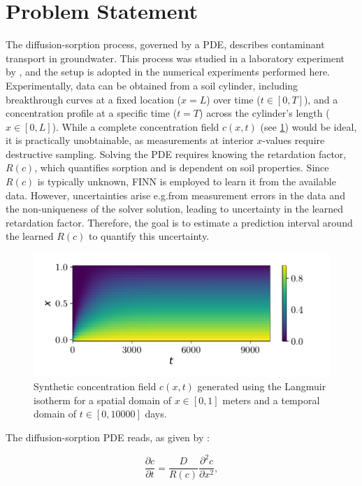 \section{Problem Statement}
The diffusion-sorption process, governed by a PDE, describes contaminant transport in groundwater. This process was studied in a laboratory experiment by \textcite{nowak2016entropy}, and the setup is adopted in the numerical experiments performed here. Experimentally, data can be obtained from a soil cylinder, including breakthrough curves at a fixed location ($x=L$) over time ($t \in [0, T]$), and a concentration profile at a specific time ($t=T$) across the cylinder's length ($x \in [0,L]$). While a complete concentration field $c(x,t)$ (see \cref{fig:c_diss_field_full}) would be ideal, it is practically unobtainable, as measurements at interior $x$-values require destructive sampling. Solving the PDE requires knowing the retardation factor, $R(c)$, which quantifies sorption and is dependent on soil properties. Since $R(c)$ is typically unknown, FINN is employed to learn it from the available data. However, uncertainties arise e.g.\@ from measurement errors in the data and the non-uniqueness of the solver solution, leading to uncertainty in the learned retardation factor. Therefore, the goal is to estimate a prediction interval around the learned $R(c)$ to quantify this uncertainty.

\begin{figure}[h]
    \centering
    \includegraphics{figs/c_diss_field_full.pdf}
    \caption{Synthetic concentration field $c(x,t)$ generated using the Langmuir isotherm for a spatial domain of $x \in [0, 1]$ meters and a temporal domain of $t \in [0, 10000]$ days.}
    \label{fig:c_diss_field_full}
\end{figure}


The diffusion-sorption PDE reads, as given by \textcite{nowak2016entropy}:

\begin{equation}
    \frac{\partial c}{\partial t} = \frac{D}{R(c)} \frac{\partial^2 c}{\partial x^2},
    \label{eq:diff-sorpt-pde}
\end{equation}

